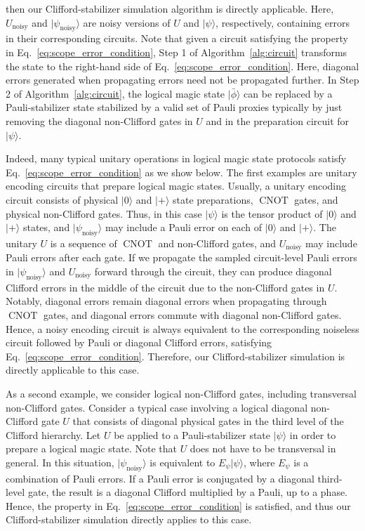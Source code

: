\documentclass[
 reprint,
 amsmath,amssymb,
 pra,superscriptaddress, nofootinbib
]{revtex4-2}
\theoremstyle{definition}
\theoremstyle{plain}
\newcommand{\CNOT}{\operatorname{CNOT}}
\begin{document}
then our Clifford-stabilizer simulation algorithm is directly applicable.
Here, $U_{\mathrm{noisy}}$ and $|\psi_{\mathrm{noisy}}\rangle$ are noisy versions of $U$ and $|\psi\rangle$, respectively, containing errors in their corresponding circuits.
Note that given a circuit satisfying the property in Eq.~\eqref{eq:scope_error_condition}, Step 1 of Algorithm~\ref{alg:circuit} transforms the state to the right-hand side of Eq.~\eqref{eq:scope_error_condition}.
Here, diagonal errors generated when propagating errors need not be propagated further.
In Step 2 of Algorithm~\ref{alg:circuit}, the logical magic state $|\bar{\phi}\rangle$ can be replaced by a Pauli-stabilizer state stabilized by a valid set of Pauli proxies typically by just removing the diagonal non-Clifford gates in $U$ and in the preparation circuit for $|\psi\rangle$. 

Indeed, many typical unitary operations in logical magic state protocols satisfy Eq.~\eqref{eq:scope_error_condition} as we show below. 
The first examples are unitary encoding circuits that prepare logical magic states.
Usually, a unitary encoding circuit consists of physical $|0\rangle$ and $|+\rangle$ state preparations, $\CNOT$ gates, and physical non-Clifford gates. 
Thus, in this case $|\psi\rangle$ is the tensor product of $|0\rangle$ and $|+\rangle$ states, and $|\psi_{\mathrm{noisy}}\rangle$ may include a Pauli error on each of $|0\rangle$ and $|+\rangle$.
The unitary $U$ is a sequence of $\CNOT$ and non-Clifford gates, and $U_{\mathrm{noisy}}$ may include Pauli errors after each gate. 
If we propagate the sampled circuit-level Pauli errors in $|\psi_{\mathrm{noisy}}\rangle$ and $U_{\mathrm{noisy}}$ forward through the circuit, they can produce diagonal Clifford errors in the middle of the circuit due to the non-Clifford gates in $U$. 
Notably, diagonal errors remain diagonal errors when propagating through $\CNOT$ gates, and diagonal errors commute with diagonal non-Clifford gates.
Hence, a noisy encoding circuit is always equivalent to the corresponding noiseless circuit followed by Pauli or diagonal Clifford errors, satisfying Eq.~\eqref{eq:scope_error_condition}.
Therefore, our Clifford-stabilizer simulation is directly applicable to this case. 

As a second example, we consider logical non-Clifford gates, including transversal non-Clifford gates. 
Consider a typical case involving a logical diagonal non-Clifford gate $U$ that consists of diagonal physical gates in the third level of the Clifford hierarchy.  Let $U$ be applied to a Pauli-stabilizer state $|\psi\rangle$ in order to prepare a logical magic state. 
Note that $U$ does not have to be transversal in general.
In this situation, $|\psi_{\mathrm{noisy}}\rangle$ is equivalent to $E_{\psi}|\psi\rangle$, where $E_{\psi}$ is a combination of Pauli errors.
If a Pauli error is conjugated by a diagonal third-level gate, the result is a diagonal Clifford multiplied by a Pauli, up to a phase.
Hence, the property in Eq.~\eqref{eq:scope_error_condition} is satisfied, and thus our Clifford-stabilizer simulation directly applies to this case. 
\end{document}
